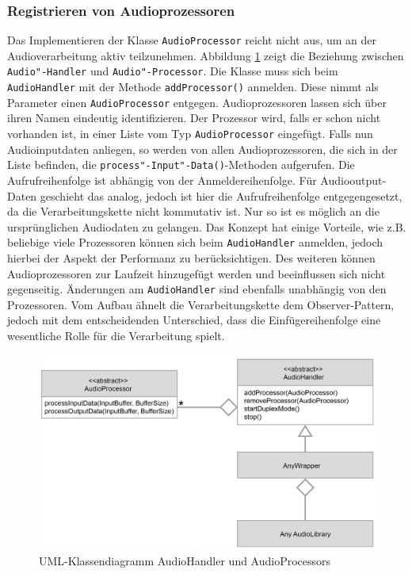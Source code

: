 \FloatBarrier
\subsubsection{Registrieren von Audioprozessoren}
Das Implementieren der Klasse \texttt{AudioProcessor} reicht nicht aus, um an der Audioverarbeitung aktiv teilzunehmen. Abbildung \ref{Fig:AudioHandlerAudioProcessor} zeigt die Beziehung zwischen \texttt{Audio"-Handler} und \texttt{Audio"-Processor}. Die Klasse muss sich beim \texttt{AudioHandler} mit der Methode \texttt{addProcessor()} anmelden. Diese nimmt als Parameter einen \texttt{AudioProcessor} entgegen. Audioprozessoren lassen sich über ihren Namen eindeutig identifizieren. Der Prozessor wird, falls er schon nicht vorhanden ist, in einer Liste vom Typ \texttt{AudioProcessor} eingefügt. Falls nun Audioinputdaten anliegen, so werden von allen Audioprozessoren, die sich in der Liste befinden, die \texttt{process"-Input"-Data()}-Methoden aufgerufen. Die Aufrufreihenfolge ist abhängig von der Anmeldereihenfolge. Für Audiooutput-Daten geschieht das analog, jedoch ist hier die Aufrufreihenfolge entgegengesetzt, da die Verarbeitungskette nicht kommutativ ist. Nur so ist es möglich an die ursprünglichen Audiodaten zu gelangen. Das Konzept hat einige Vorteile, wie z.B. beliebige viele Prozessoren können sich beim \texttt{AudioHandler} anmelden, jedoch hierbei der Aspekt der Performanz zu berücksichtigen. Des weiteren können Audioprozessoren zur Laufzeit hinzugefügt werden und beeinflussen sich nicht gegenseitig. Änderungen am \texttt{AudioHandler} sind ebenfalls unabhängig von den Prozessoren.
Vom Aufbau ähnelt die Verarbeitungskette dem Observer-Pattern, jedoch mit dem entscheidenden Unterschied, dass die Einfügereihenfolge eine wesentliche Rolle für die Verarbeitung spielt. 
\newline
\begin{figure}[htp]
\centering
\includegraphics[width=1\textwidth]{../img/AudioHandlerAudioProcessor}
\caption{UML-Klassendiagramm AudioHandler und AudioProcessors}
\label{Fig:AudioHandlerAudioProcessor}
\end{figure}

